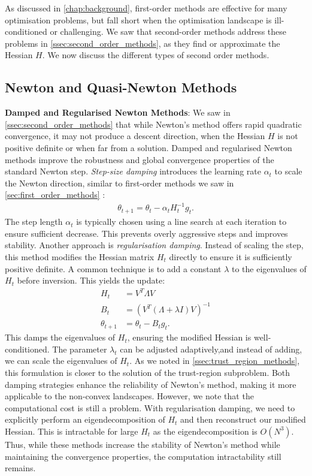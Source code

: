 As discussed in \cref{chap:background}, first-order methods are effective for many optimisation problems, but fall short when the optimisation landscape is ill-conditioned or challenging. We saw that second-order methods address these problems in \cref{ssec:second_order_methods}, as they find or approximate the Hessian $H$. We now discuss the different types of second order methods. 

\subsection{Newton and Quasi-Newton Methods} 
\label{sec:newton_methods}

\textbf{Damped and Regularised Newton Methods}:
We saw in \cref{ssec:second_order_methods} that while Newton's method offers rapid quadratic convergence, it may not produce a descent direction, when the Hessian $H$ is not positive definite or when far from a solution. Damped and regularised Newton methods improve the robustness and global convergence properties of the standard Newton step. \textit{Step-size damping} introduces the learning rate $\alpha_t$ to scale the Newton direction, similar to first-order methods we saw in \cref{sec:first_order_methods} \citep{sun2019survey}:
\begin{align}
    \theta_{t+1} = \theta_t - \alpha_t H_t^{-1} g_t.
\end{align}
The step length $\alpha_t$ is typically chosen using a line search at each iteration to ensure sufficient decrease. This prevents overly aggressive steps and improves stability. Another approach is \textit{regularisation damping}. Instead of scaling the step, this method modifies the Hessian matrix $H_t$ directly to ensure it is sufficiently positive definite. A common technique is to add a constant $\lambda$ to the eigenvalues of $H_t$ before inversion. This yields the update:
\begin{align}
    H_t &= V^T \Lambda V \\
    B_t &= (V^T (\Lambda + \lambda I) V)^{-1} \\
    \theta_{t+1} &= \theta_t - B_t g_t.
\end{align}
This damps the eigenvalues of $H_t$, ensuring the modified Hessian is well-conditioned. The parameter $\lambda_t$ can be adjusted adaptively,and instead of adding, we can scale the eigenvalues of $H_t$. As we noted in \cref{ssec:trust_region_methods}, this formulation is closer to the solution of the trust-region subproblem. Both damping strategies enhance the reliability of Newton's method, making it more applicable to the non-convex landscapes. However, we note that the computational cost is still a problem. With regularisation damping, we need to explicitly perform an eigendecomposition of $H_t$ and then reconstruct our modified Hessian. This is intractable for large $H_t$ as the eigendecomposition is $O(N^3)$. Thus, while these methods increase the stability of Newton's method while maintaining the convergence properties, the computation intractability still remains.


